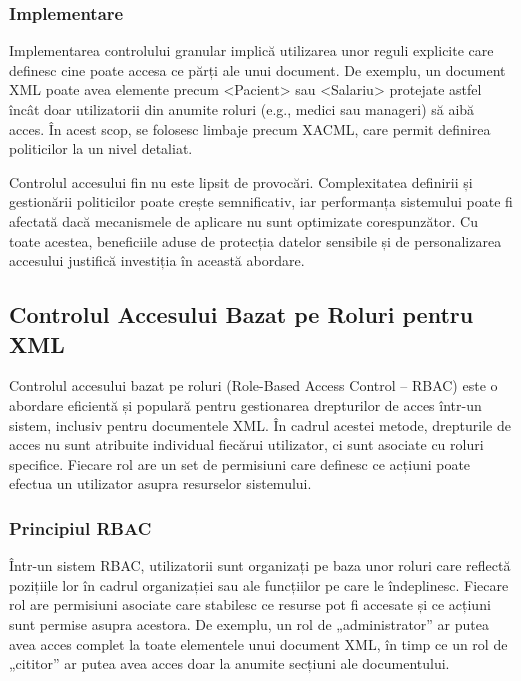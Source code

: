 \documentclass[runningheads]{llncs}
\begin{document}
\subsubsection{Implementare}

Implementarea controlului granular implică utilizarea unor reguli explicite care definesc cine poate accesa ce părți ale unui document. De exemplu, un document XML poate avea elemente precum <Pacient> sau <Salariu> protejate astfel încât doar utilizatorii din anumite roluri (e.g., medici sau manageri) să aibă acces. În acest scop, se folosesc limbaje precum XACML, care permit definirea politicilor la un nivel detaliat.

Controlul accesului fin nu este lipsit de provocări. Complexitatea definirii și gestionării politicilor poate crește semnificativ, iar performanța sistemului poate fi afectată dacă mecanismele de aplicare nu sunt optimizate corespunzător. Cu toate acestea, beneficiile aduse de protecția datelor sensibile și de personalizarea accesului justifică investiția în această abordare.



\subsection{Controlul Accesului Bazat pe Roluri pentru XML}

Controlul accesului bazat pe roluri (Role-Based Access Control – RBAC) este o abordare eficientă și populară pentru gestionarea drepturilor de acces într-un sistem, inclusiv pentru documentele XML. În cadrul acestei metode, drepturile de acces nu sunt atribuite individual fiecărui utilizator, ci sunt asociate cu roluri specifice. Fiecare rol are un set de permisiuni care definesc ce acțiuni poate efectua un utilizator asupra resurselor sistemului.

\subsubsection{Principiul RBAC}

Într-un sistem RBAC, utilizatorii sunt organizați pe baza unor roluri care reflectă pozițiile lor în cadrul organizației sau ale funcțiilor pe care le îndeplinesc. Fiecare rol are permisiuni asociate care stabilesc ce resurse pot fi accesate și ce acțiuni sunt permise asupra acestora. De exemplu, un rol de „administrator” ar putea avea acces complet la toate elementele unui document XML, în timp ce un rol de „cititor” ar putea avea acces doar la anumite secțiuni ale documentului.
\end{document}
